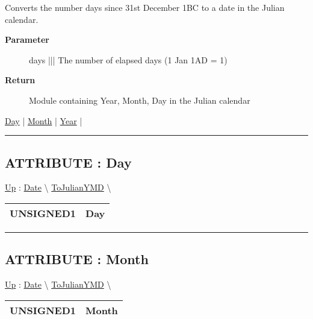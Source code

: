 \par
Converts the number days since 31st December 1BC to a date in the Julian calendar.

\par
\begin{description}
\item [\textbf{Parameter}] days ||| The number of elapsed days (1 Jan 1AD = 1)
\item [\textbf{Return}] Module containing Year, Month, Day in the Julian calendar
\end{description}

\hyperlink{ecldoc:date.tojulianymd.result.day}{Day}  |
\hyperlink{ecldoc:date.tojulianymd.result.month}{Month}  |
\hyperlink{ecldoc:date.tojulianymd.result.year}{Year}  |

\rule{\linewidth}{0.5pt}

\subsection*{ATTRIBUTE : Day}
\hypertarget{ecldoc:date.tojulianymd.result.day}{}
\hyperlink{ecldoc:date.tojulianymd}{Up} :
\hspace{0pt} \hyperlink{ecldoc:Date}{Date} \textbackslash 
\hspace{0pt} \hyperlink{ecldoc:date.tojulianymd}{ToJulianYMD} \textbackslash 

{\renewcommand{\arraystretch}{1.5}
\begin{tabularx}{\textwidth}{|>{\raggedright\arraybackslash}l|X|}
\hline
\hspace{0pt}UNSIGNED1 & Day \\
\hline
\end{tabularx}
}

\par


\rule{\linewidth}{0.5pt}
\subsection*{ATTRIBUTE : Month}
\hypertarget{ecldoc:date.tojulianymd.result.month}{}
\hyperlink{ecldoc:date.tojulianymd}{Up} :
\hspace{0pt} \hyperlink{ecldoc:Date}{Date} \textbackslash 
\hspace{0pt} \hyperlink{ecldoc:date.tojulianymd}{ToJulianYMD} \textbackslash 

{\renewcommand{\arraystretch}{1.5}
\begin{tabularx}{\textwidth}{|>{\raggedright\arraybackslash}l|X|}
\hline
\hspace{0pt}UNSIGNED1 & Month \\
\hline
\end{tabularx}
}

